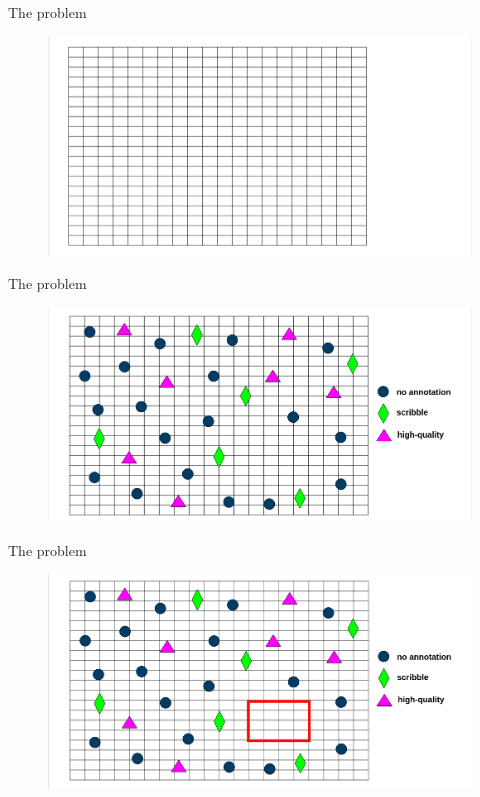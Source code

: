 \documentclass{beamer}
\begin{document}
\begin{frame}{The problem}
	\begin{figure}
		\centering
		\includegraphics[width=0.85\linewidth]{images/figure_08}
	\end{figure}
\end{frame}

\begin{frame}{The problem}
	\begin{figure}
		\centering
		\includegraphics[width=0.85\linewidth]{images/figure_09}
	\end{figure}
\end{frame}


\begin{frame}{The problem}
	\begin{figure}
		\centering
		\includegraphics[width=0.85\linewidth]{images/figure_10}
	\end{figure}
\end{frame}
\end{document}
